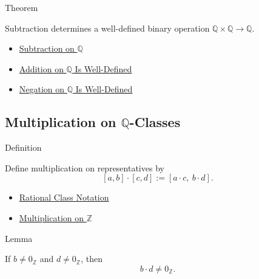 \begin{theorembox}{Theorem}
\begin{theorem}
\label{thm:subtraction-on-q-well-defined}
Subtraction determines a well-defined binary operation
$\mathbb{Q}\times\mathbb{Q}\to\mathbb{Q}$.
\end{theorem}
\end{theorembox}

\begin{dependencies}
\begin{itemize}
  \item \hyperref[def:subtraction-on-q]{Subtraction on $\mathbb{Q}$}
  \item \hyperref[thm:addition-on-q-well-defined]{Addition on $\mathbb{Q}$ Is Well-Defined}
  \item \hyperref[thm:negation-on-q-well-defined]{Negation on $\mathbb{Q}$ Is Well-Defined}
\end{itemize}
\end{dependencies}

\subsection*{Multiplication on $\mathbb{Q}$-Classes}

\begin{definitionbox}{Definition}
\begin{definition}
\label{def:multiplication-on-q-classes}
Define multiplication on representatives by
\[
[a,b]\cdot[c,d]:=[a\cdot c,\ b\cdot d].
\]
\end{definition}
\end{definitionbox}

\begin{dependencies}
\begin{itemize}
  \item \hyperref[def:rational-class-notation]{Rational Class Notation}
  \item \hyperref[def:multiplication-on-z-classes]{Multiplication on $\mathbb{Z}$}
\end{itemize}
\end{dependencies}

\begin{lemmabox}{Lemma}
\begin{lemma}
\label{lem:multiplication-denominator-nonzero-q}
If $b\ne 0_{\mathbb{Z}}$ and $d\ne 0_{\mathbb{Z}}$, then
\[
b\cdot d\ne 0_{\mathbb{Z}}.
\]
\end{lemma}
\end{lemmabox}

